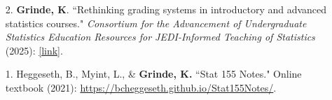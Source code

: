 \documentclass[margin]{res}
\begin{document}
\begin{resume}
\begin{itemize}
\item[2.] \textbf{Grinde, K}. ``Rethinking grading systems in introductory and advanced statistics courses." \textit{Consortium for the Advancement of Undergraduate Statistics Education Resources for JEDI-Informed Teaching of Statistics} (2025): \href{https://causeweb.org/jedi/post/rethinking-grading-systems}{[link]}.

\item[1.] Heggeseth, B., Myint, L., \& \textbf{Grinde, K.} ``Stat 155 Notes." Online textbook (2021): \href{https://bcheggeseth.github.io/Stat155Notes/}{https://bcheggeseth.github.io/Stat155Notes/}. 

\end{itemize}



\end{resume}
\end{document}
